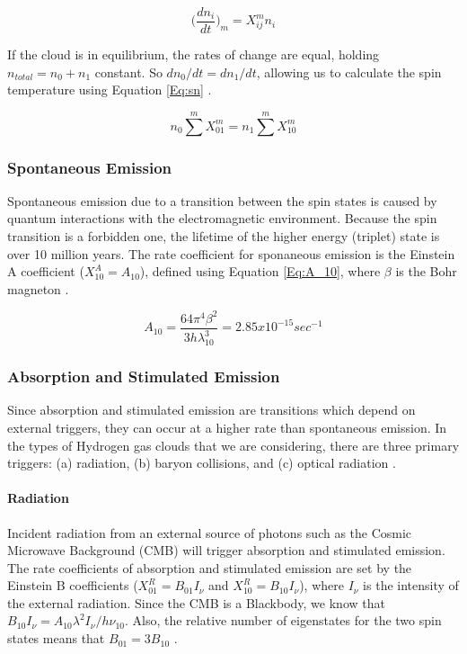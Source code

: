 \begin{equation} \label{Eq:dn}
\Big( \frac{d n_i}{dt} \Big)_m = X^m_{ij} n_i
\end{equation}

If the cloud is in equilibrium, the rates of change are equal, holding $n_{total} = n_0 + n_1$ constant. So $d n_0/dt = d n_1 /dt$, allowing us to calculate the spin temperature using Equation \ref{Eq:sn} \cite{field_1958}. 

\begin{equation} \label{Eq:sn}
n_0 \sum^m X^m_{01} = n_1 \sum^m X^m_{10}
\end{equation}

\subsubsection{Spontaneous Emission}

Spontaneous emission due to a transition between the spin states is caused by quantum interactions with the electromagnetic environment. Because the spin transition is a forbidden one, the lifetime of the higher energy (triplet) state is over 10 million years. The rate coefficient for sponaneous emission is the Einstein A coefficient ($X^A_{10} = A_{10}$), defined using Equation \ref{Eq:A_10}, where $\beta$ is the Bohr magneton \cite{field_1958}. 


\begin{equation} \label{Eq:A_10}
A_{10} = \frac{64 \pi^4 \beta^2}{3 h \lambda^3_{10}} = 2.85 x 10^{-15} sec^{-1}
\end{equation}


\subsubsection{Absorption and Stimulated Emission}

Since absorption and stimulated emission are transitions which depend on external triggers, they can occur at a higher rate than spontaneous emission. In the types of Hydrogen gas clouds that we are considering, there are three primary triggers: (a) \cm radiation, (b) baryon collisions, and (c) optical radiation \cite{field_1958}. 

\paragraph{\cm Radiation}

Incident radiation from an external source of \cm photons such as the Cosmic Microwave Background (CMB) will trigger absorption and stimulated emission. The rate coefficients of absorption and stimulated emission are set by the Einstein B coefficients ($X^R_{01} = B_{01} I_\nu$ and $X^R_{10} = B_{10} I_{\nu}$), where $I_{\nu}$ is the intensity of the external radiation. Since the CMB is a Blackbody, we know that $B_{10} I_{\nu} = A_{10} \lambda^2 I_{\nu}/ h \nu_{10}$. Also, the relative number of eigenstates for the two spin states means that $B_{01} = 3 B_{10}$ \cite{field_1958}. 



